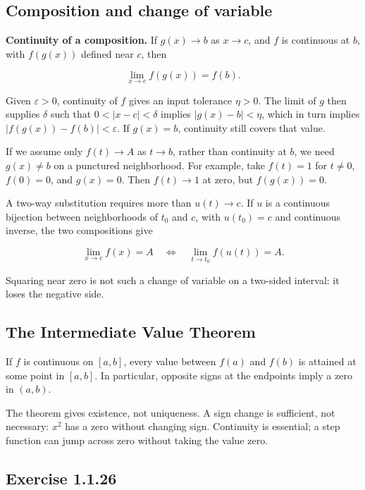 \documentclass[11pt,a4paper]{article}
\begin{document}
\subsection{Composition and change of
variable}\label{composition-and-change-of-variable}

\textbf{Continuity of a composition.} If \(g(x)\to b\) as \(x\to c\),
and \(f\) is continuous at \(b\), with \(f(g(x))\) defined near \(c\),
then

\[
\lim_{x\to c}f(g(x))=f(b).
\]

Given \(\varepsilon>0\), continuity of \(f\) gives an input tolerance
\(\eta>0\). The limit of \(g\) then supplies \(\delta\) such that
\(0<|x-c|<\delta\) implies \(|g(x)-b|<\eta\), which in turn implies
\(|f(g(x))-f(b)|<\varepsilon\). If \(g(x)=b\), continuity still covers
that value.

If we assume only \(f(t)\to A\) as \(t\to b\), rather than continuity at
\(b\), we need \(g(x)\ne b\) on a punctured neighborhood. For example,
take \(f(t)=1\) for \(t\ne0\), \(f(0)=0\), and \(g(x)=0\). Then
\(f(t)\to1\) at zero, but \(f(g(x))=0\).

A two-way substitution requires more than \(u(t)\to c\). If \(u\) is a
continuous bijection between neighborhoods of \(t_0\) and \(c\), with
\(u(t_0)=c\) and continuous inverse, the two compositions give

\[
\lim_{x\to c}f(x)=A\quad\Longleftrightarrow\quad
\lim_{t\to t_0}f(u(t))=A.
\]

Squaring near zero is not such a change of variable on a two-sided
interval: it loses the negative side.

\subsection{The Intermediate Value
Theorem}\label{the-intermediate-value-theorem}

If \(f\) is continuous on \([a,b]\), every value between \(f(a)\) and
\(f(b)\) is attained at some point in \([a,b]\). In particular, opposite
signs at the endpoints imply a zero in \((a,b)\).

The theorem gives existence, not uniqueness. A sign change is
sufficient, not necessary: \(x^2\) has a zero without changing sign.
Continuity is essential; a step function can jump across zero without
taking the value zero.

\subsection{Exercise 1.1.26}\label{exercise-1.1.26}
\end{document}
